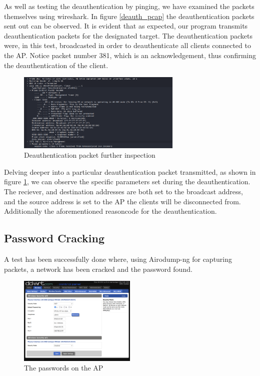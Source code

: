 As well as testing the deauthentication by pinging, we have examined the packets themselves using wireshark. In figure \ref{deauth_pcap} the deauthentication packets sent out can be observed. It is evident that as expected, our program transmits deauthentication packets for the designated target. The deauthentication packets were, in this test, broadcasted in order to deauthenticate all clients connected to the AP. 
Notice packet number 381, which is an acknowledgement, thus confirming the deauthentication of the client.


\begin{figure}[!htbp]
    \centering
    \includegraphics[width=0.7\textwidth]{Latex-Files/Billeder/Tests/deauth_pcap_packet.png}
    \caption{Deauthentication packet further inspection}
    \label{deauth_pcap_packet}
\end{figure}

Delving deeper into a particular deauthentication packet transmitted, as shown in figure \ref{deauth_pcap_packet}, we can observe the specific parameters set during the deauthentication. The reciever, and destination addresses are both set to the broadcast address, and the source address is set to the AP the clients will be disconnected from. Additionally the aforementioned reasoncode for the deauthentication.


\subsection{Password Cracking}
A test has been successfully done where, using Airodump-ng for capturing packets, a network has been cracked and the password found. 

\begin{figure}[!htbp]
    \centering
    \includegraphics[width=0.5\textwidth]{Latex-Files/Billeder/Kode2.png}
    \caption{The passwords on the AP}
    \label{Crack2}
\end{figure}


